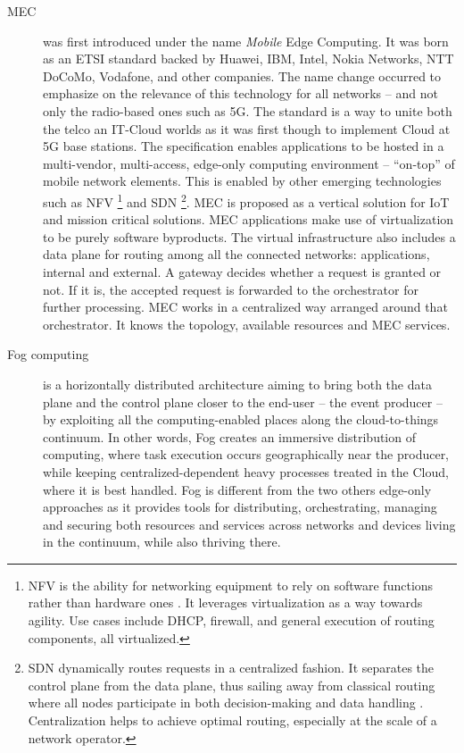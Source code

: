 \documentclass[11pt]{sdm}
\begin{document}
\begin{description}
	\item[\acrfull{MEC}] was first introduced under the name \emph{Mobile} Edge Computing. It was born as an \gls{ETSI} standard backed by Huawei, IBM, Intel, Nokia Networks, NTT DoCoMo, Vodafone, and other companies. The name change occurred to emphasize on the relevance of this technology for all networks -- and not only the radio-based ones such as 5G. The standard is a way to unite both the telco an IT-Cloud worlds \cite{dahmen-lhuissier_etsi_nodate-1} as it was first though to implement Cloud at 5G base stations. The specification enables applications to be hosted in a multi-vendor, multi-access, edge-only computing environment -- ``on-top'' of mobile network elements. This is enabled by other emerging technologies such as \gls{NFV} \footnote{\acrfull{NFV} is the ability for networking equipment to rely on software functions rather than hardware ones \cite{redhat_what_2019}. It leverages virtualization as a way towards agility. Use cases include DHCP, firewall, and general execution of routing components, all virtualized.} and \gls{SDN} \footnote{\acrfull{SDN} dynamically routes requests in a centralized fashion. It separates the control plane from the data plane, thus sailing away from classical routing where all nodes participate in both decision-making and data handling \cite{redhat_what_2019}. Centralization helps to achieve optimal routing, especially at the scale of a network operator.}. \gls{MEC} is proposed as a vertical solution for \gls{IoT} and mission critical solutions. \gls{MEC} applications make use of virtualization to be purely software byproducts. The virtual infrastructure also includes a data plane for routing among all the connected networks: applications, internal and external. A gateway decides whether a request is granted or not. If it is, the accepted request is forwarded to the orchestrator for further processing. \gls{MEC} works in a centralized way arranged around that orchestrator. It knows the topology, available resources and \gls{MEC} services.
	
	\item[Fog computing] is a horizontally distributed architecture aiming to bring both the data plane and the control plane closer to the end-user -- the event producer -- by exploiting all the computing-enabled places along the cloud-to-things continuum. In other words, Fog creates an immersive distribution of computing, where task execution occurs geographically near the producer, while keeping centralized-dependent heavy processes treated in the Cloud, where it is best handled. Fog is different from the two others edge-only approaches as it provides tools for distributing, orchestrating, managing and securing both resources and services across networks and devices living in the continuum, while also thriving there.
	

\end{description}
\end{document}
